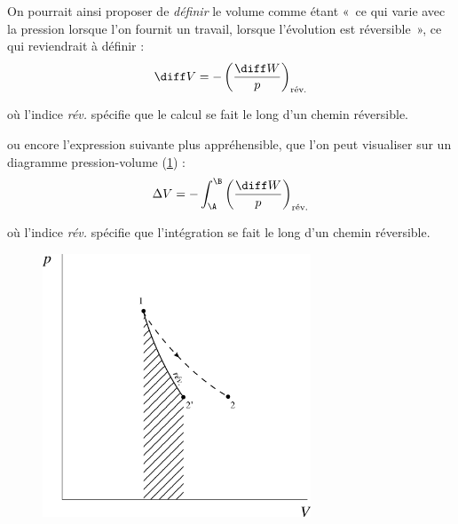 		On pourrait ainsi proposer de \emph{définir} le volume comme étant «~ce qui varie avec la pression lorsque l’on fournit un travail, lorsque l’évolution est réversible~», ce qui reviendrait à définir :
		\begin{equation}
			\diff V = - \left( \frac{\diff W}{p} \right)_\text{rév.}
		\end{equation}
		\begin{equationterms}
			\item où l’indice \textit{rév.} spécifie que le calcul se fait le long d’un chemin réversible.
		\end{equationterms}
		ou encore l’expression suivante plus appréhensible, que l’on peut visualiser sur un diagramme pression-volume (\cref{fig_pv_reversible_irreversible}) :
		\begin{equation}
			\Delta V = -\int_\A^\B \left( \frac{\diff W}{p} \right)_\text{rév.}
			\label{eq_redéfinition_volume}
		\end{equation}
		\begin{equationterms}
			\item où l’indice \textit{rév.} spécifie que l’intégration se fait le long d’un chemin réversible.
		\end{equationterms}

		\begin{figure}
			\begin{center}
				\includegraphics[width=8cm]{images/pv_reversible_irreversible.png}
			\end{center}
			\label{fig_pv_reversible_irreversible}
		\end{figure}

